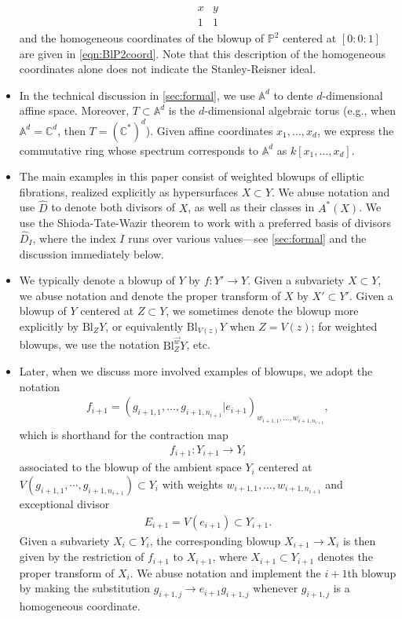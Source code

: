\documentclass[11pt,oneside,english]{article}
\numberwithin{equation}{section}
\theoremstyle{definition}
\begin{document}
\begin{itemize}
\begin{align}
		\begin{array}{cc}
		x & y \\\hline
		1 & 1
		\end{array}
	\end{align}
and the homogeneous coordinates of the blowup of $\mathbb P^2$ centered at $[0:0:1]$ are given in \cref{eqn:BlP2coord}. Note that this description of the homogeneous coordinates alone does not indicate the Stanley-Reisner ideal. 
\item In the technical discussion in \cref{sec:formal}, we use $\mathbb A^d$ to dente $d$-dimensional affine space. Moreover, $T \subset \mathbb A^d$ is the $d$-dimensional algebraic torus (e.g., when $\mathbb A^d = \mathbb C^d$, then $T = (\mathbb C^*)^d$). Given affine coordinates $x_1, \dots, x_d$, we express the commutative ring whose spectrum corresponds to $\mathbb A^d$ as $k[x_1,\dots,x_d]$. 
\item The main examples in this paper consist of weighted blowups of elliptic fibrations, realized explicitly as hypersurfaces $X \subset Y$. We abuse notation and use $\hat D$ to denote both divisors of $X$, as well as their classes in $A^*(X)$. We use the Shioda-Tate-Wazir theorem to work with a preferred basis of divisors $\hat D_I$, where the index $I$ runs over various values---see \cref{sec:formal} and the discussion immediately below. 
\item We typically denote a blowup of $Y$ by $f: Y' \rightarrow Y$. Given a subvariety $X \subset Y$, we abuse notation and denote the proper transform of $X$ by $X' \subset Y'$. Given a blowup of $Y$ centered at $Z \subset Y$, we sometimes denote the blowup more explicitly by $\text{Bl}_{Z} Y$, or equivalently $\text{Bl}_{V(z)} Y$ when $Z= V(z)$; for weighted blowups, we use the notation $\text{Bl}^{\vec{w}}_{Z} Y$, etc. 
\item Later, when we discuss more involved examples of blowups, we adopt the notation 
	\begin{align}
	f_{i+1} =
  (g_{i+1,1},\dots,g_{i+1,n_{i+1}} |e_{i+1} )_{w_{i+1,1},\dots,w_{i+1,n_{i+1}}}, 
 \end{align}
 which is shorthand for the
  contraction map 
  	\begin{align}
	f_{i+1}:Y_{i+1} \rightarrow Y_i
\end{align}
 associated to the blowup of the ambient space $Y_i$
 centered at $V( g_{i+1,1}, \cdots,  g_{i+1,n_{i+1}})
\subset Y_i$ with weights $w_{i+1,1},\dots,w_{i+1,n_{i+1}}$ and exceptional divisor 
	\begin{align}
		E_{i+1} = V(e_{i+1}) \subset Y_{i+1}.
	\end{align}
Given a subvariety $X_i \subset Y_i$, the corresponding blowup $X_{i+1} \rightarrow X_i$ is then given
  by the restriction of $f_{i+1}$ to $X_{i+1}$, where $X_{i+1} \subset Y_{i+1}$ denotes the proper transform of $X_i$. We abuse notation
  and implement the $i+1$th blowup by making the substitution
  $g_{i+1,j} \rightarrow e_{i+1} g_{i+1,j}$ whenever $g_{i+1,j}$ is a homogeneous coordinate. 
  

\end{itemize}
\end{document}

